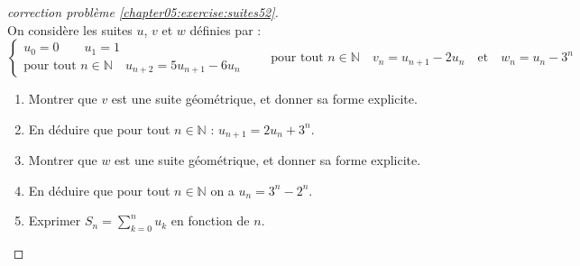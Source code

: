 \documentclass[main.tex]{subfiles}
\begin{document}
\begin{proof}[correction problème \ref{chapter05:exercise:suites52}]\hfill \\
On considère les suites $u$, $v$ et $w$ définies par : 
\setlength{\abovedisplayskip}{3pt}
\setlength{\belowdisplayskip}{3pt}
$$
\begin{cases}
	u_0=0 \qquad u_1=1 \\
	\text{pour tout $n\in\mathbb{N}$} \quad  u_{n+2}=5u_{n+1}-6u_n
\end{cases}
\qquad 
	 \text{pour tout $n\in\mathbb{N}$} \quad  v_n=u_{n+1}-2u_n
	 \quad 
	 \text{et} \quad  w_n=u_{n}-3^{n}
$$ 
\begin{enumerate}[leftmargin=*,label=\arabic*)]
	\item Montrer que $v$ est une suite géométrique, et donner sa forme explicite.
	\item En déduire que pour tout $n\in\mathbb{N}$ : $u_{n+1}=2u_n+3^n$.
	\item Montrer que $w$ est une suite géométrique, et donner sa forme explicite.
	\item En déduire que pour tout $n\in\mathbb{N}$ on a $u_n=3^n-2^n$.
	\item Exprimer $S_n=\sum_{k=0}^{n} u_k$ en fonction de $n$. 
\end{enumerate} 
\end{proof}



%	 
\end{document}
